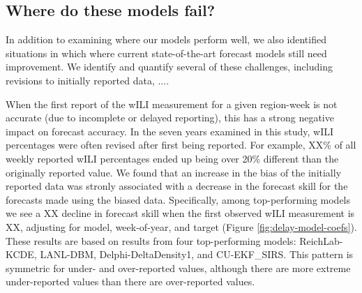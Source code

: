 \documentclass{article}\usepackage[]{graphicx}\usepackage[]{color}
\begin{document}



% 


\subsection{Where do these models fail?}

In addition to examining where our models perform well, we also identified situations in which where current state-of-the-art forecast models still need improvement. 
We identify and quantify several of these challenges, including revisions to initially reported data, ....

When the first report of the wILI measurement for a given region-week is not accurate (due to incomplete or delayed reporting), this has a strong negative impact on forecast accuracy.
In the seven years examined in this study, wILI percentages were often revised after first being reported. 
For example, XX\% of all weekly reported wILI percentages ended up being over 20\% different than the originally reported value.
We found that an increase in the bias of the initially reported data was stronly associated with a decrease in the forecast skill for the forecasts made using the biased data.
Specifically, among top-performing models we see a XX decline in forecast skill when the first observed wILI measurement is XX, adjusting for model, week-of-year, and target (Figure \ref{fig:delay-model-coefs}).
These results are based on results from four top-performing models: ReichLab-KCDE, LANL-DBM, Delphi-DeltaDensity1, and CU-EKF\_SIRS.
This pattern is symmetric for under- and over-reported values, although there are more extreme under-reported values than there are over-reported values. 
\end{document}
